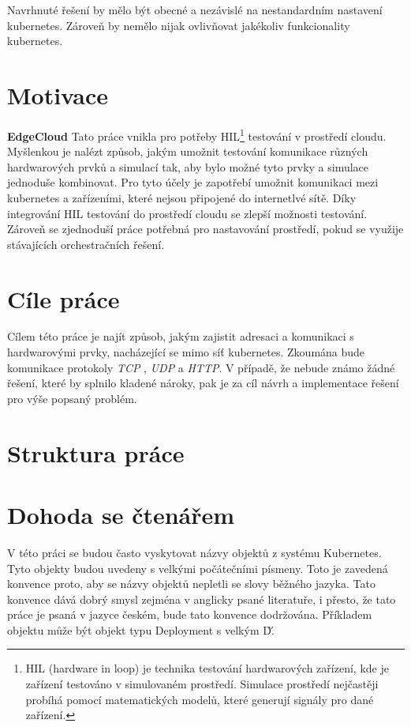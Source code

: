 Navrhnuté řešení by mělo být obecné a nezávislé na nestandardním nastavení kubernetes. Zároveň by nemělo nijak ovlivňovat jakékoliv funkcionality kubernetes. 

\newpage

\section{Motivace}
\textbf{EdgeCloud}
Tato práce vnikla pro potřeby HIL\footnote{HIL (hardware in loop) je technika testování hardwarových zařízení, kde je zařízení testováno v simulovaném prostředí. Simulace prostředí nejčastěji probíhá pomocí matematických modelů, které generují signály pro dané zařízení.} testování v prostředí cloudu. Myšlenkou je nalézt způsob, jakým umožnit testování komunikace různých hardwarových prvků a simulací tak, aby bylo možné tyto prvky a simulace jednoduše kombinovat. Pro tyto účely je zapotřebí umožnit komunikaci mezi kubernetes a zařízeními, které nejsou připojené do internetlvé sítě. Díky integrování HIL testování do prostředí cloudu se zlepší možnosti testování. Zároveň se zjednoduší práce potřebná pro nastavování prostředí, pokud se využije stávajících orchestračních řešení.

\section{Cíle práce}
Cílem této práce je najít způsob, jakým zajistit adresaci a komunikaci s hardwarovými prvky, nacházející se mimo síť kubernetes. Zkoumána bude komunikace protokoly \textit{TCP} , \textit{UDP} a \textit{HTTP}. V případě, že nebude známo žádné řešení, které by splnilo kladené nároky, pak je za cíl návrh a implementace řešení pro výše popsaný problém.

\section{Struktura práce}
\section{Dohoda se čtenářem}
V této práci se budou často vyskytovat názvy objektů z systému Kubernetes. Tyto objekty budou uvedeny s velkými počátečními písmeny. Toto je zavedená konvence proto, aby se názvy objektů nepletli se slovy běžného jazyka. Tato konvence dává dobrý smysl zejména v anglicky psané literatuře, i přesto, že tato práce je psaná v jazyce českém, bude tato konvence dodržována. Příkladem objektu může být objekt typu Deployment s velkým \'D\'.

